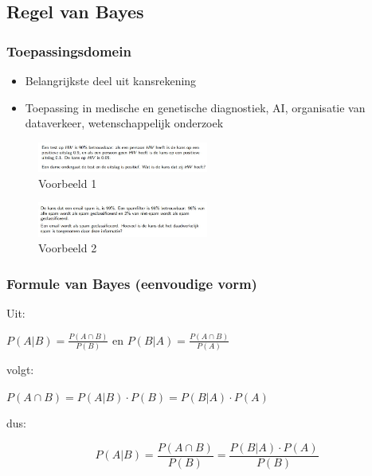 \documentclass{article}
\begin{document}
\subsection{Regel van Bayes}

\subsubsection{Toepassingsdomein}

\begin{itemize}
    \item Belangrijkste deel uit kansrekening
    \item Toepassing in medische en genetische diagnostiek, AI, organisatie van dataverkeer, wetenschappelijk onderzoek
\end{itemize}

\begin{figure}[H]
    \centering
    \includegraphics[width=0.5\textwidth]{bayes-voorbeeld1.png}
    \caption{Voorbeeld 1}
\end{figure}

\begin{figure}[H]
    \centering
    \includegraphics[width=0.5\textwidth]{bayes-voorbeeld2.png}
    \caption{Voorbeeld 2}
\end{figure}

\subsubsection{Formule van Bayes (eenvoudige vorm)}

Uit:

\begin{center}
    $P(A | B) = \frac{P(A \cap B)}{P(B)}$ en $P(B | A) = \frac{P(A \cap B)}{P(A)}$
\end{center}

volgt:

\begin{center}
    $P(A \cap B) = P(A | B) \cdot P(B) = P(B | A) \cdot P(A)$
\end{center}

dus:

\begin{equation}
    P(A | B) = \frac{P(A \cap B)}{P(B)} = \frac{P(B | A) \cdot P(A)}{P(B)}
\end{equation}
\end{document}
